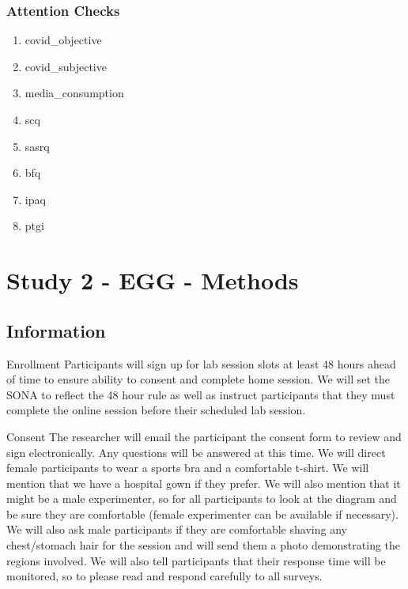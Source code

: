 \documentclass[]{book}
\providecommand{\tightlist}{%
  \setlength{\itemsep}{0pt}\setlength{\parskip}{0pt}}
\begin{document}
\hypertarget{attention-checks}{%
\subsection{Attention Checks}\label{attention-checks}}

\begin{enumerate}
\def\labelenumi{\arabic{enumi}.}
\tightlist
\item
  covid\_objective
\item
  covid\_subjective
\item
  media\_consumption
\item
  scq
\item
  sasrq
\item
  bfq
\item
  ipaq
\item
  ptgi
\end{enumerate}

\hypertarget{study-2---egg---methods}{%
\chapter{Study 2 - EGG - Methods}\label{study-2---egg---methods}}

\hypertarget{information-1}{%
\section{Information}\label{information-1}}

Enrollment
Participants will sign up for lab session slots at least 48 hours ahead of time to ensure ability to consent and complete home session. We will set the SONA to reflect the 48 hour rule as well as instruct participants that they must complete the online session before their scheduled lab session.

Consent
The researcher will email the participant the consent form to review and sign electronically. Any questions will be answered at this time. We will direct female participants to wear a sports bra and a comfortable t-shirt. We will mention that we have a hospital gown if they prefer. We will also mention that it might be a male experimenter, so for all participants to look at the diagram and be sure they are comfortable (female experimenter can be available if necessary). We will also ask male participants if they are comfortable shaving any chest/stomach hair for the session and will send them a photo demonstrating the regions involved. We will also tell participants that their response time will be monitored, so to please read and respond carefully to all surveys.
\end{document}
